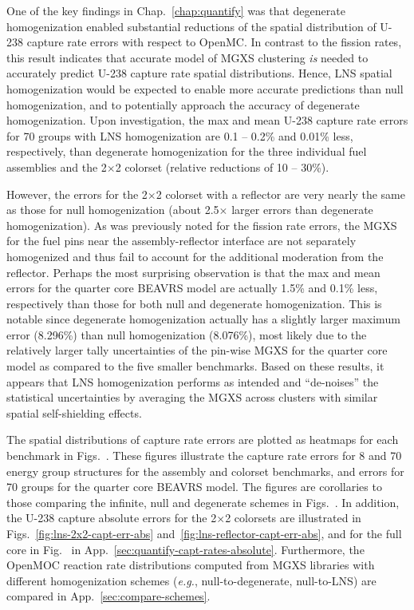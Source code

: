 One of the key findings in Chap.~\ref{chap:quantify} was that degenerate homogenization enabled substantial reductions of the spatial distribution of U-238 capture rate errors with respect to OpenMC. In contrast to the fission rates, this result indicates that accurate model of \ac{MGXS} clustering \textit{is} needed to accurately predict U-238 capture rate spatial distributions. Hence, \ac{LNS} spatial homogenization would be expected to enable more accurate predictions than null homogenization, and to potentially approach the accuracy of degenerate homogenization. Upon investigation, the max and mean U-238 capture rate errors for 70 groups with \ac{LNS} homogenization are 0.1  -- 0.2\% and 0.01\% less, respectively, than degenerate homogenization for the three individual fuel assemblies and the 2$\times$2 colorset (relative reductions of 10 -- 30\%).

However, the errors for the 2$\times$2 colorset with a reflector are very nearly the same as those for null homogenization (about 2.5$\times$ larger errors than degenerate homogenization). As was previously noted for the fission rate errors, the \ac{MGXS} for the fuel pins near the assembly-reflector interface are not separately homogenized and thus fail to account for the additional moderation from the reflector. Perhaps the most surprising observation is that the max and mean errors for the quarter core \ac{BEAVRS} model are actually 1.5\% and 0.1\% less, respectively than those for both null and degenerate homogenization. This is notable since degenerate homogenization actually has a slightly larger maximum error (8.296\%) than null homogenization (8.076\%), most likely due to the relatively larger tally uncertainties of the pin-wise \ac{MGXS} for the quarter core model as compared to the five smaller benchmarks. Based on these results, it appears that \ac{LNS} homogenization performs as intended and ``de-noises'' the statistical uncertainties by averaging the \ac{MGXS} across clusters with similar spatial self-shielding effects.

The spatial distributions of capture rate errors are plotted as heatmaps for each benchmark in Figs.~. These figures illustrate the capture rate errors for 8 and 70 energy group structures for the assembly and colorset benchmarks, and errors for 70 groups for the quarter core \ac{BEAVRS} model. The figures are corollaries to those comparing the infinite, null and degenerate schemes in Figs.~. In addition, the U-238 capture absolute errors for the 2$\times$2 colorsets are illustrated in Figs.~\ref{fig:lns-2x2-capt-err-abs} and~\ref{fig:lns-reflector-capt-err-abs}, and for the full core in Fig.~ in App.~\ref{sec:quantify-capt-rates-absolute}. Furthermore, the OpenMOC reaction rate distributions computed from \ac{MGXS} libraries with different homogenization schemes (\textit{e.g.}, null-to-degenerate, null-to-\ac{LNS}) are compared in App.~\ref{sec:compare-schemes}.

